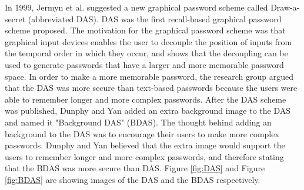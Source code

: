    \begin{figure}[H]
      \centering
    \end{figure}

  In 1999, Jermyn et al. \cite{Jermyn} suggested a new graphical password scheme called Draw-a-secret (abbreviated DAS). DAS was the first recall-based graphical password scheme proposed. The motivation for the graphical password scheme was that graphical input devices enables the user to decouple the position of inputs from the temporal order in which they occur, and shows that the decoupling can be used to generate passwords that have a larger and more memorable password space. In order to make a more memorable password, the research group argued that the DAS was more secure than text-based passwords because the users were able to remember longer and more complex passwords. After the DAS scheme was published, Dunphy and Yan \cite{BDAS} added an extra background image to the DAS and named it "Background DAS" (BDAS). The thought behind adding an background to the DAS was to encourage their users to make more complex passwords. Dunphy and Yan believed that the extra image would support the users to remember longer and more complex passwords, and therefore stating that the BDAS was more secure than DAS. Figure \ref{fig:DAS} and Figure \ref{fig:BDAS} are showing images of the DAS and the BDAS respectively.

